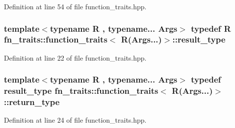 Definition at line 54 of file function\+\_\+traits.\+hpp.

\subsubsection[{\texorpdfstring{result\+\_\+type}{result_type}}]{\setlength{\rightskip}{0pt plus 5cm}template$<$typename R , typename... Args$>$ typedef R {\bf fn\+\_\+traits\+::function\+\_\+traits}$<$ R(Args...)$>$\+::{\bf result\+\_\+type}\hspace{0.3cm}{\ttfamily [inherited]}}\hypertarget{structfn__traits_1_1function__traits_3_01_r_07_args_8_8_8_08_4_a1b509243ed1b4707465625de10e6c6bb}{}\label{structfn__traits_1_1function__traits_3_01_r_07_args_8_8_8_08_4_a1b509243ed1b4707465625de10e6c6bb}


Definition at line 22 of file function\+\_\+traits.\+hpp.

\subsubsection[{\texorpdfstring{return\+\_\+type}{return_type}}]{\setlength{\rightskip}{0pt plus 5cm}template$<$typename R , typename... Args$>$ typedef {\bf result\+\_\+type} {\bf fn\+\_\+traits\+::function\+\_\+traits}$<$ R(Args...)$>$\+::{\bf return\+\_\+type}\hspace{0.3cm}{\ttfamily [inherited]}}\hypertarget{structfn__traits_1_1function__traits_3_01_r_07_args_8_8_8_08_4_adf6a35a9b703dfb4778e59f132e00a9b}{}\label{structfn__traits_1_1function__traits_3_01_r_07_args_8_8_8_08_4_adf6a35a9b703dfb4778e59f132e00a9b}


Definition at line 24 of file function\+\_\+traits.\+hpp.

